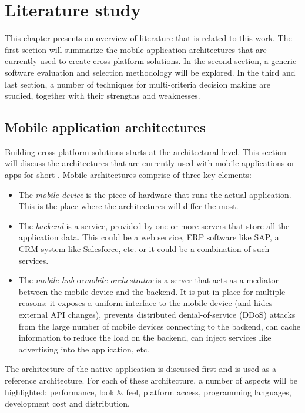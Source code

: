 \chapter{Literature study}
\label{chap:literature}

This chapter presents an overview of literature that is related to this work. The first section will summarize the mobile application architectures that are currently used to create cross-platform solutions. In the second section, a generic software evaluation and selection methodology will be explored. In the third and last section, a number of techniques for multi-criteria decision making are studied, together with their strengths and weaknesses.

\section{Mobile application architectures}

Building cross-platform solutions starts at the architectural level. This section will discuss the architectures that are currently used with mobile applications or apps for short \cite{Friese}. Mobile architectures comprise of three key elements: 

\begin{itemize}
    \item The \emph{mobile device} is the piece of hardware that runs the actual application. This is the place where the architectures will differ the most.
    \item The \emph{backend} is a service, provided by one or more servers that store all the application data. This could be a web service, ERP software like SAP, a CRM system like Salesforce, etc. or it could be a combination of such services.
    \item The \emph{mobile hub} or\emph{mobile orchestrator} is a server that acts as a mediator between the mobile device and the backend. It is put in place for multiple reasons: it exposes a uniform interface to the mobile device (and hides external API changes), prevents distributed denial-of-service (DDoS) attacks from the large number of mobile devices connecting to the backend, can cache information to reduce the load on the backend, can inject services like advertising into the application, etc.
\end{itemize}

The architecture of the native application is discussed first and is used as a reference architecture. For each of these architecture, a number of aspects will be highlighted: performance, look \& feel, platform access, programming languages, development cost and distribution.

